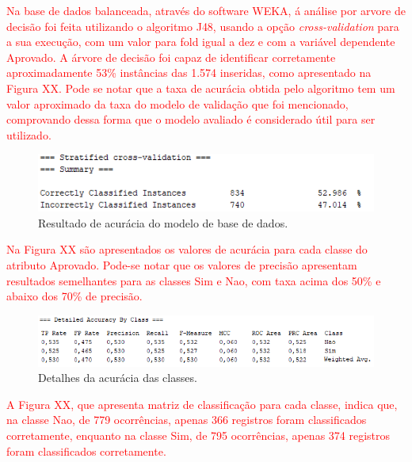 \par
\textcolor{red}{Na base de dados balanceada, através do software WEKA, á análise por arvore de decisão foi feita utilizando o algoritmo J48, usando a opção \textit{cross-validation} para a sua execução, com um valor para fold igual a dez e com a variável dependente Aprovado. A árvore de decisão foi capaz de identificar corretamente aproximadamente 53\% instâncias das 1.574 inseridas, como apresentado na Figura XX. Pode se notar que a taxa de acurácia obtida pelo algoritmo tem um valor aproximado da taxa do modelo de validação que foi mencionado, comprovando dessa forma que o modelo avaliado é considerado útil para ser utilizado.}

\par
\begin{figure}[!htp]
	\begin{center}
    \caption{\label{fig:waveform_fig} Resultado de acurácia do modelo de base de dados.}
	\includegraphics[scale=0.99]{Figuras/Resultado_acuracia.png}
	\end{center}
\end{figure}

\par
\textcolor{red}{Na Figura XX são apresentados os valores de acurácia para cada classe do atributo Aprovado. Pode-se notar que os valores de precisão apresentam resultados semelhantes para as classes Sim e Nao, com taxa acima dos 50\% e abaixo dos 70\% de precisão.}

\par
\begin{figure}[!htp]
	\begin{center}
    \caption{\label{fig:waveform_fig} Detalhes da acurácia das classes.}
	\includegraphics[scale=0.93]{Figuras/Tabela_de_acuracia_das_classes.png}
	\end{center}
\end{figure}

\textcolor{red}{A Figura XX, que apresenta matriz de classificação para cada classe, indica que, na classe Nao, de 779 ocorrências, apenas 366 registros foram classificados corretamente, enquanto na classe Sim, de 795 ocorrências, apenas 374 registros foram classificados corretamente.}

